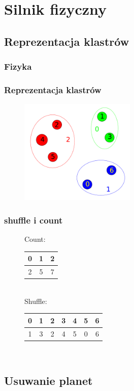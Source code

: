 \documentclass{beamer}
\begin{document}

\section{Silnik fizyczny}
\subsection{Reprezentacja klastrów}

\frame
{
	\frametitle{Fizyka}
	\tableofcontents[currentsubsection]
}

\frame
{
	\frametitle{Reprezentacja klastrów}
	\begin{figure}
	\centering
		\includegraphics[height=5cm]{img/clusters.pdf}
	\end{figure}
	\setcounter{subfigure}{0}
}

\frame
{
	\frametitle{shuffle i count}
	\begin{figure}
		\centering
		Count: \\
		\begin{tabular}{|c|c|c|}
		\hline
		0 & 1 & 2 \\
		\hline
		2 & 5 & 7 \\
		\hline
		\end{tabular} \\
		\pause
		\vspace{1cm}
		Shuffle: \\
		\begin{tabular}{|c|c||c|c|c||c|c|}
		\hline
		0 & 1 & 2 & 3 & 4 & 5 & 6 \\
		\hline
		1 & 3 & 2 & 4 & 5 & 0 & 6 \\
		\hline
		\end{tabular} \\
	\end{figure}
}

\subsection{Usuwanie planet}
\end{document}
